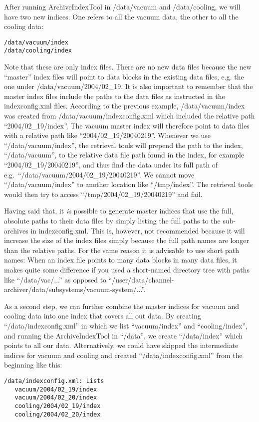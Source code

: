 \noindent After running ArchiveIndexTool in /data/vacuum and /data/cooling,
we will have two new indices. One refers to all the vacuum data, the
other to all the cooling data:
\begin{lstlisting}[frame=none,keywordstyle=\sffamily]
/data/vacuum/index
/data/cooling/index
\end{lstlisting}
\noindent Note that these are only index files. There are no new data
files because the new ``master'' index files will point to data blocks
in the existing data files, e.g. the one under /data/vacuum/2004/02\_19. 
It is also important to remember that the master index files include the
paths to the data files as instructed in the indexconfig.xml files.
According to the previous example,  
/data/vacuum/index was created from
/data/vacuum/indexconfig.xml which included the relative path
``2004/02\_19/index''. The vacuum master index will therefore point to
data files with a relative path like ``2004/02\_19/20040219''.
Whenever we use ``/data/vacuum/index'', the retrieval tools will prepend
the path to the index, ``/data/vacuum'', to the relative data 
file path found in the index, for example ``2004/02\_19/20040219'', and thus
find the data under its full path of
 e.g.\ ``/data/vacuum/2004/02\_19/20040219''.
We cannot move ``/data/vacuum/index'' to another location like
``/tmp/index''. The retrieval tools would then try to access
``/tmp/2004/02\_19/20040219'' and fail.

Having said that, it \emph{is} possible to generate master indices
that use the full, absolute paths to their data files by simply listing
the full paths to the sub-archives in indexconfig.xml. This is,
however, not recommended because it will increase the size of the
index files simply because the full path names are longer than the
relative paths. For the same reason it is advisable to use short path
names: When an index file points to many data blocks in many data
files, it makes quite some difference if you used a short-named
directory tree with paths like ``/data/vac/...'' as opposed to
``/user/data/channel-archiver/data/subsystems/vacuum-system/...''.

As a second step, we can further combine the master indices for vacuum
and cooling data into one index that covers all out data. By creating
``/data/indexconfig.xml'' in which we list ``vacuum/index'' and
``cooling/index'', and running the ArchiveIndexTool in
``/data'', we create ``/data/index'' which points to all our data.
Alternatively, we could have skipped the intermediate indices for
vacuum and cooling and created ``/data/indexconfig.xml'' from the
beginning like this:
\begin{lstlisting}[frame=none,keywordstyle=\sffamily]
/data/indexconfig.xml: Lists
   vacuum/2004/02_19/index
   vacuum/2004/02_20/index
   cooling/2004/02_19/index
   cooling/2004/02_20/index
\end{lstlisting}

